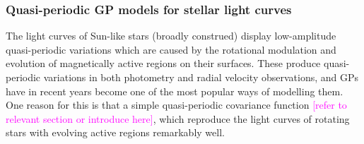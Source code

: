 \documentclass[letterpaper]{ar-1col}
\newcommand{\suz}[1]{\textcolor{magenta}{#1}}
\begin{document}
\subsubsection{Quasi-periodic GP models for stellar light curves}

The light curves of Sun-like stars (broadly construed) display low-amplitude quasi-periodic variations which are caused by the rotational modulation and evolution of magnetically active regions on their surfaces. These produce quasi-periodic variations in both photometry and radial velocity observations, and GPs have in recent years become one of the most popular ways of modelling them. One reason for this is that a simple quasi-periodic covariance function  \suz{[refer to relevant section or introduce here]}, which reproduce the light curves of rotating stars with evolving active regions remarkably well.

\end{document}
